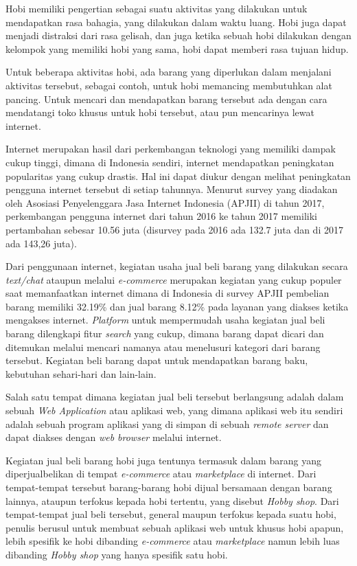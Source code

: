 \documentclass[a4paper]{article}
\begin{document}
Hobi memiliki pengertian sebagai suatu aktivitas yang dilakukan untuk mendapatkan rasa bahagia, yang dilakukan dalam waktu luang. Hobi juga dapat menjadi distraksi dari rasa gelisah, dan juga ketika sebuah hobi dilakukan dengan kelompok yang memiliki hobi yang sama, hobi dapat memberi rasa tujuan hidup\autocite{zaidi2022passion}. 


Untuk beberapa aktivitas hobi, ada barang yang diperlukan dalam menjalani aktivitas tersebut, sebagai contoh, untuk hobi memancing membutuhkan alat pancing. Untuk mencari dan mendapatkan barang tersebut ada dengan cara mendatangi toko khusus untuk hobi tersebut, atau pun mencarinya lewat internet.


Internet merupakan hasil dari perkembangan teknologi yang memiliki dampak cukup tinggi, dimana di Indonesia sendiri, internet mendapatkan peningkatan popularitas yang cukup drastis. Hal ini dapat diukur dengan melihat peningkatan pengguna internet tersebut di setiap tahunnya. Menurut survey yang diadakan oleh Asosiasi Penyelenggara Jasa Internet Indonesia (APJII) di tahun 2017, perkembangan pengguna internet dari tahun 2016 ke tahun 2017 memiliki pertambahan sebesar 10.56 juta (disurvey pada 2016 ada 132.7 juta dan di 2017 ada 143,26 juta)\autocite{indonesia2017infografis}.


Dari penggunaan internet, kegiatan usaha jual beli barang yang dilakukan secara \textit{text/chat} ataupun melalui \textit{e-commerce} merupakan kegiatan yang cukup populer saat memanfaatkan internet dimana di Indonesia di survey APJII pembelian barang memiliki 32.19\% dan jual barang 8.12\% pada layanan yang diakses ketika mengakses internet\autocite{indonesia2017infografis}. \textit{Platform} untuk mempermudah usaha kegiatan jual beli barang dilengkapi fitur \textit{search} yang cukup, dimana barang dapat dicari dan ditemukan melalui mencari namanya atau menelusuri kategori dari barang tersebut. Kegiatan beli barang dapat untuk mendapatkan barang baku, kebutuhan sehari-hari dan lain-lain. 


Salah satu tempat dimana kegiatan jual beli tersebut berlangsung adalah dalam sebuah \textit{Web Application} atau aplikasi web, yang dimana aplikasi web itu sendiri adalah sebuah program aplikasi yang di simpan di sebuah \textit{remote server} dan dapat diakses dengan \textit{web browser} melalui internet\autocite{what-is-web-app}.


Kegiatan jual beli barang hobi juga tentunya termasuk dalam barang yang diperjualbelikan di tempat \textit{e-commerce} atau \textit{marketplace} di internet. Dari tempat-tempat tersebut barang-barang hobi dijual bersamaan dengan barang lainnya, ataupun terfokus kepada hobi tertentu, yang disebut \textit{Hobby shop}. Dari tempat-tempat jual beli tersebut, general maupun terfokus kepada suatu hobi, penulis berusul untuk membuat sebuah aplikasi web untuk khusus hobi apapun, lebih spesifik ke hobi dibanding \textit{e-commerce} atau \textit{marketplace} namun lebih luas dibanding \textit{Hobby shop} yang hanya spesifik satu hobi. 
\end{document}
